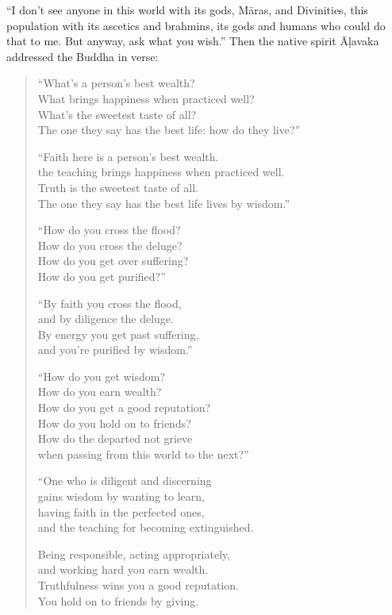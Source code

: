 \documentclass[12pt,openany]{book}%
\begin{document}
“I don’t see anyone in this world with its gods, \textsanskrit{Māras}, and Divinities, this population with its ascetics and brahmins, its gods and humans who could do that to me. But anyway, ask what you wish.” Then the native spirit \textsanskrit{Āḷavaka} addressed the Buddha in verse: 

\begin{verse}%
“What’s a person’s best wealth? \\
What brings happiness when practiced well? \\
What’s the sweetest taste of all? \\
The one they say has the best life: how do they live?” 

“Faith here is a person’s best wealth. \\
the teaching brings happiness when practiced well. \\
Truth is the sweetest taste of all. \\
The one they say has the best life lives by wisdom.” 

“How do you cross the flood? \\
How do you cross the deluge? \\
How do you get over suffering? \\
How do you get purified?” 

“By faith you cross the flood, \\
and by diligence the deluge. \\
By energy you get past suffering, \\
and you’re purified by wisdom.” 

“How do you get wisdom? \\
How do you earn wealth? \\
How do you get a good reputation? \\
How do you hold on to friends? \\
How do the departed not grieve \\
when passing from this world to the next?” 

“One who is diligent and discerning \\
gains wisdom by wanting to learn, \\
having faith in the perfected ones, \\
and the teaching for becoming extinguished. 

Being responsible, acting appropriately, \\
and working hard you earn wealth. \\
Truthfulness wins you a good reputation. \\
You hold on to friends by giving. 


\end{verse}
\end{document}
